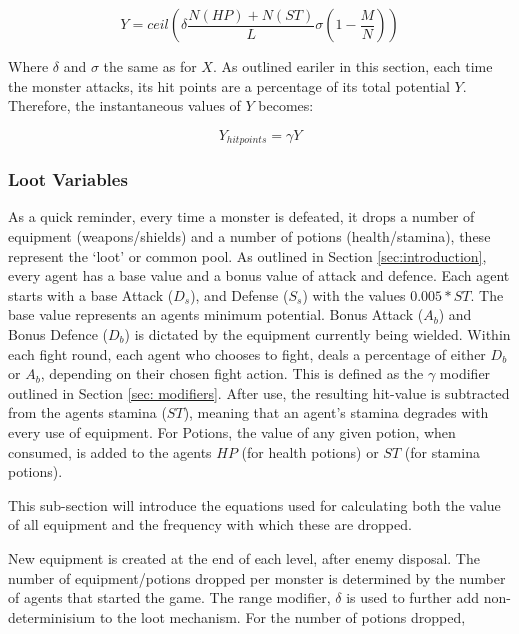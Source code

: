 \begin{equation}\label{eq:Y}
    Y = ceil \left(\delta \frac{N(HP)+N(ST)}{L} \sigma \left(1-\frac{M}{N} \right) \right)
\end{equation}

Where $\delta$ and $\sigma$ the same as for $X$. As outlined eariler in this section, each time the monster attacks, its hit points are a percentage of its total potential $Y$. Therefore, the instantaneous values of $Y$ becomes:

\begin{equation}
    Y_{hit points} = \gamma Y 
\end{equation}


\subsubsection{Loot Variables} \label{sec: loot}

As a quick reminder, every time a monster is defeated, it drops a number of equipment (weapons/shields) and a number of potions (health/stamina), these represent the `loot' or common pool. As outlined in Section \ref{sec:introduction}, every agent has a base value and a bonus value of attack and defence. Each agent starts with a base Attack ($D_s$), and Defense ($S_s$) with the values $0.005*ST$. The base value represents an agents minimum potential.
Bonus Attack ($A_b$) and Bonus Defence ($D_b$) is dictated by the equipment currently being wielded. Within each fight round, each agent who chooses to fight, deals a percentage of either $D_b$ or $A_b$, depending on their chosen fight action. This is defined as the $\gamma$ modifier outlined in Section \ref{sec: modifiers}. After use, the resulting hit-value is subtracted from the agents stamina ($ST$), meaning that an agent's stamina degrades with every use of equipment. For Potions, the value of any given potion, when consumed, is added to the agents $HP$ (for health potions) or $ST$ (for stamina potions). 

This sub-section will introduce the equations used for calculating both the value of all equipment and the frequency with which these are dropped. 




New equipment is created at the end of each level, after enemy disposal. The number of equipment/potions dropped per monster is determined by the number of agents that started the game. The range modifier, $\delta$ is used to further add non-determinisium to the loot mechanism. For the number of potions dropped,

